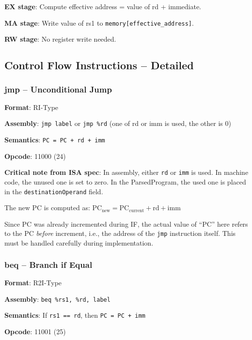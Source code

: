 \documentclass[12pt,a4paper]{article}
\begin{document}
\textbf{EX stage}: Compute effective address = value of rd + immediate.

\textbf{MA stage}: Write value of rs1 to \texttt{memory[effective\_address]}.

\textbf{RW stage}: No register write needed.

\subsection{Control Flow Instructions -- Detailed}

\subsubsection{jmp -- Unconditional Jump}

\begin{tcolorbox}[colback=red!5, colframe=red!50!black]
\textbf{Format}: RI-Type

\textbf{Assembly}: \texttt{jmp label} or \texttt{jmp \%rd} (one of rd or imm is used, the other is 0)

\textbf{Semantics}: \texttt{PC = PC + rd + imm}

\textbf{Opcode}: 11000 (24)
\end{tcolorbox}

\textbf{Critical note from ISA spec}: In assembly, either \texttt{rd} or \texttt{imm} is used. In machine code, the unused one is set to zero. In the ParsedProgram, the used one is placed in the \texttt{destinationOperand} field.

The new PC is computed as: $\text{PC}_{\text{new}} = \text{PC}_{\text{current}} + \text{rd} + \text{imm}$

Since PC was already incremented during IF, the actual value of ``PC'' here refers to the PC \emph{before} increment, i.e., the address of the \texttt{jmp} instruction itself. This must be handled carefully during implementation.

\subsubsection{beq -- Branch if Equal}

\begin{tcolorbox}[colback=red!5, colframe=red!50!black]
\textbf{Format}: R2I-Type

\textbf{Assembly}: \texttt{beq \%rs1, \%rd, label}

\textbf{Semantics}: If \texttt{rs1 == rd}, then \texttt{PC = PC + imm}

\textbf{Opcode}: 11001 (25)
\end{tcolorbox}
\end{document}
